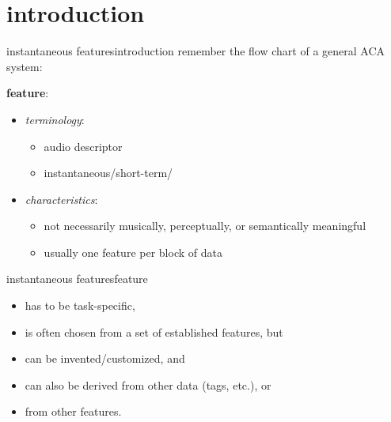     \section[intro]{introduction}
        \begin{frame}{instantaneous features}{introduction}
            remember the flow chart of a general ACA system:
            \vspace{-2mm}
            \begin{figure}
                
            \end{figure}
            
            \vspace{-2mm}
            \pause
            \textbf{feature}:
            \begin{itemize}
                \item<2->   \textit{terminology}: 
                    \begin{itemize}
                        \item   audio descriptor
                        \item   instantaneous/short-term/
                    \end{itemize}
                \item<3->   \textit{characteristics}:
                    \begin{itemize}
                        \item	not necessarily musically, perceptually, or semantically meaningful
                        \item	usually one feature per block of data
                    \end{itemize}
            \end{itemize}
        \end{frame}
        \begin{frame}{instantaneous features}{feature}
            
            
            \begin{itemize}
                \item   has to be task-specific,
                \item<2->   is often chosen from a set of established features, but
                \item<3->   can be invented/customized, and
                \item<4->   can also be derived from other data (tags, etc.), or
                \item<5->   from other features.
            \end{itemize}
        \end{frame}
